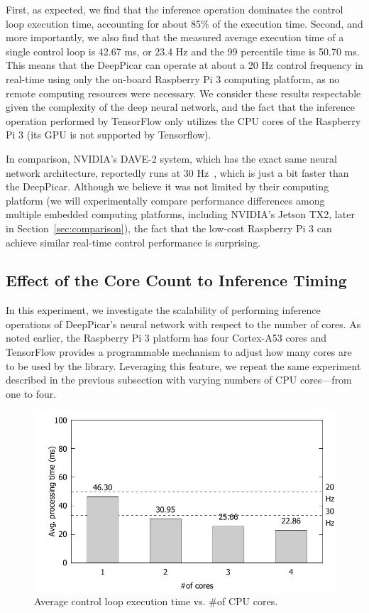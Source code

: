 First, as expected, we find that the inference operation
dominates the control loop execution time, accounting for about 85\% of
the execution time.
Second, and more importantly, we also find that the measured average
execution time of a single control loop is 42.67 ms, or 23.4 Hz and
the 99 percentile time is 50.70 ms.
This means that the DeepPicar can operate
at about a 20 Hz control frequency in real-time using only the on-board
Raspberry Pi 3 computing platform, as no remote computing resources 
were necessary. We consider these results respectable given the complexity
of the deep neural network, and the fact that the inference operation
performed by TensorFlow only utilizes the CPU cores of the
Raspberry Pi 3 (its GPU is not supported by Tensorflow).

In comparison, NVIDIA's DAVE-2 system, which has the exact same neural
network architecture, reportedly runs at 30 Hz~\cite{Bojarski2016}, which 
is just a bit faster than the DeepPicar. Although we believe it was not
limited by their computing platform (we will experimentally compare
performance differences among multiple embedded computing platforms,
including NVIDIA's Jetson TX2, later in
Section~\ref{sec:comparison}), the fact that the low-cost
Raspberry Pi 3 can achieve similar real-time control performance is
surprising.

\subsection{Effect of the Core Count to Inference Timing}

In this experiment, we investigate the scalability of performing
inference operations of DeepPicar's neural network with respect to the
number of cores. As noted earlier, the Raspberry Pi 3 platform has
four Cortex-A53 cores and TensorFlow 
provides a programmable mechanism to adjust how many cores are to be
used by the library. Leveraging this feature, we repeat the
same experiment described in the previous subsection with varying
numbers of CPU cores---from one to four.


\begin{figure}[h]
  \centering
  \includegraphics[width=.7\textwidth]{figs/perf_vs_corecnt}
  \caption{Average control loop execution time vs. \#of CPU
    cores.}
  \label{fig:perf-vs-corecnt}
\end{figure}

